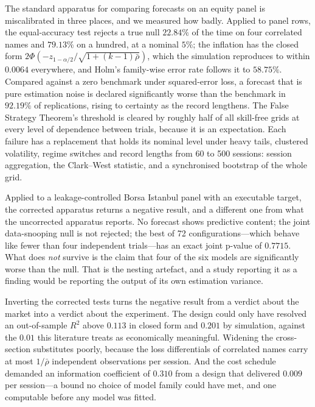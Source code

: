\documentclass{article}
\theoremstyle{plain}
\theoremstyle{remark}
\begin{document}
The standard apparatus for comparing forecasts on an equity panel is
miscalibrated in three places, and we measured how badly. Applied to panel rows,
the equal-accuracy test rejects a true null $22.84\%$ of the time on four
correlated names and $79.13\%$ on a hundred, at a nominal $5\%$; the inflation
has the closed form $2\Phi(-z_{1-\alpha/2}/\sqrt{1+(k-1)\bar\rho})$, which the
simulation reproduces to within $0.0064$ everywhere, and Holm's family-wise
error rate follows it to $58.75\%$. Compared against a zero benchmark under
squared-error loss, a forecast that is pure estimation noise is declared
significantly worse than the benchmark in $92.19\%$ of replications, rising to
certainty as the record lengthens. The False Strategy Theorem's threshold is
cleared by roughly half of all skill-free grids at every level of dependence
between trials, because it is an expectation. Each failure has a replacement
that holds its nominal level under heavy tails, clustered volatility, regime
switches and record lengths from 60 to 500 sessions: session aggregation, the
Clark--West statistic, and a synchronised bootstrap of the whole grid.

Applied to a leakage-controlled Borsa Istanbul panel with an executable target,
the corrected apparatus returns a negative result, and a different one from what
the uncorrected apparatus reports. No forecast shows predictive content; the
joint data-snooping null is not rejected; the best of 72 configurations---which
behave like fewer than four independent trials---has an exact joint p-value of
$0.7715$. What does \emph{not} survive is the claim that four of the six models
are significantly worse than the null. That is the nesting artefact, and a study
reporting it as a finding would be reporting the output of its own estimation
variance.

Inverting the corrected tests turns the negative result from a verdict about the
market into a verdict about the experiment. The design could only have resolved
an out-of-sample $R^2$ above $0.113$ in closed form and $0.201$ by simulation,
against the $0.01$ this literature treats as economically meaningful. Widening
the cross-section substitutes poorly, because the loss differentials of
correlated names carry at most $1/\bar\rho$ independent observations per
session. And the cost schedule demanded an information coefficient of $0.310$
from a design that delivered $0.009$ per session---a bound no choice of model
family could have met, and one computable before any model was fitted.
\end{document}
